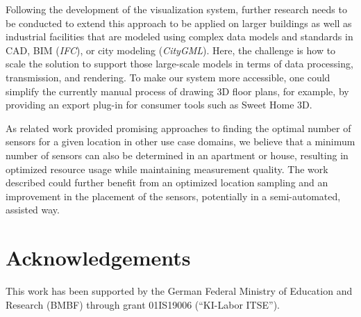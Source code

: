 \documentclass{egpubl}
\begin{document}
Following the development of the visualization system, further research needs to be conducted to extend this approach to be applied on larger buildings as well as industrial facilities that are modeled using complex data models and standards in CAD, BIM (\emph{IFC}), or city modeling (\emph{CityGML}). Here, the challenge is how to scale the solution to support those large-scale models in terms of data processing, transmission, and rendering.
To make our system more accessible, one could simplify the currently manual process of drawing 3D floor plans, for example, by providing an export plug-in for consumer tools such as Sweet Home 3D. 

As related work provided promising approaches to finding the optimal number of sensors for a given location in other use case domains\cite{jedermann2009-minimum}, we believe that a minimum number of sensors can also be determined in an apartment or house, resulting in optimized resource usage while maintaining measurement quality.
The work described could further benefit from an optimized location sampling and an improvement in the placement of the sensors\cite{huang2015-sampling}, potentially in a semi-automated, assisted way.

\section*{Acknowledgements}
This work has been supported by the German Federal Ministry of Education and Research (BMBF) through grant 01IS19006  (\enquote{KI-Labor ITSE}).



\end{document}
